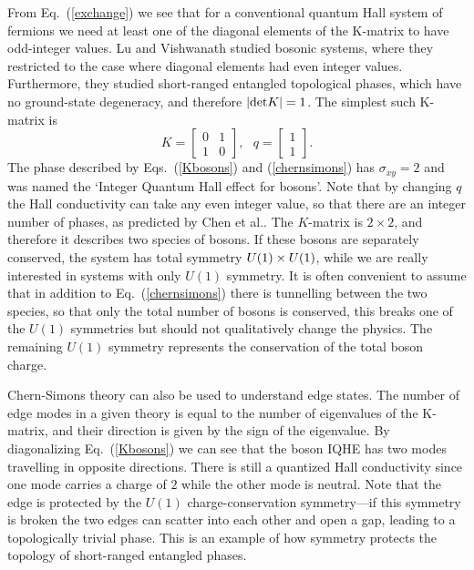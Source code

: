 From Eq.~(\ref{exchange}) we see that for a conventional quantum Hall system of fermions we need at least one of the diagonal elements of the K-matrix to have odd-integer values. Lu and Vishwanath studied bosonic systems, where they restricted to the case where diagonal elements had even integer values. Furthermore, they studied short-ranged entangled topological phases, which have no ground-state degeneracy, and therefore $|{\rm det}K|=1$. The simplest such K-matrix is
\begin{equation}
K=\left[\begin{array}{cc} 0 & 1 \\ 1 & 0\end{array}\right],~~~q=\left[\begin{array}{cc} 1\\ 1 \end{array}\right].
\label{Kbosons}
\end{equation}
The phase described by Eqs.~(\ref{Kbosons}) and (\ref{chernsimons}) has $\sigma_{xy}=2$ and was named the `Integer Quantum Hall effect for bosons'. Note that by changing $q$ the Hall conductivity can take any even integer value, so that there are an integer number of phases, as predicted by Chen et al.\cite{WenScience,WenPRB}. The $K$-matrix is $2\times2$, and therefore it describes two species of bosons. If these bosons are separately conserved, the system has total symmetry $U(1)\times U(1)$, while we are really interested in systems with only $U(1)$ symmetry. It is often convenient to 
assume that in addition to Eq.~(\ref{chernsimons}) there is tunnelling between the two species, so that only the total number of bosons is conserved, this breaks one of the $U(1)$ symmetries but should not qualitatively change the physics. The remaining $U(1)$ symmetry represents the conservation of the total boson charge.

Chern-Simons theory can also be used to understand edge states\cite{Wen_book}. The number of edge modes in a given theory is equal to the number of eigenvalues of the K-matrix, and their direction is given by the sign of the eigenvalue. By diagonalizing Eq.~(\ref{Kbosons}) we can see that the boson IQHE has two modes travelling in opposite directions. There is still a quantized Hall conductivity since one mode carries a charge of $2$ while the other mode is neutral. Note that the edge is protected by the $U(1)$ charge-conservation symmetry---if this symmetry is broken the two edges can scatter into each other and open a gap, leading to a topologically trivial phase. This is an example of how symmetry protects the topology of short-ranged entangled phases.

